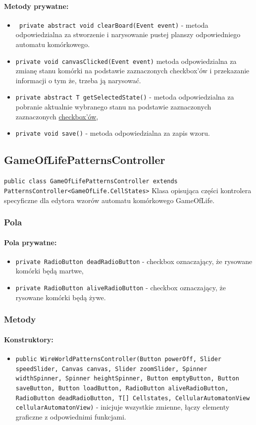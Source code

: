 \documentclass{report}
\begin{document}
\paragraph{Metody prywatne:}
\begin{itemize}
 	\item \texttt{ private abstract void clearBoard(Event event)} - metoda odpowiedzialna za stworzenie i narysowanie pustej planszy odpowiedniego automatu komórkowego.
 	\item \texttt{private void canvasClicked(Event event)} metoda odpowiedzialna za zmianę stanu komórki na podstawie zaznaczonych checkbox'ów i przekazanie informacji o tym że, trzeba ją narysować.
 	\item \texttt{private abstract T getSelectedState()} - metoda odpowiedzialna za pobranie aktualnie wybranego stanu na podstawie zaznaczonych  zaznaczonych \hyperref[sec:checkbox]{checkbox'ów},
 	\item \texttt{private void save()} - metoda odpowiedzialna za zapis wzoru.
\end{itemize}

\subsection{GameOfLifePatternsController}
\texttt{public class GameOfLifePatternsController extends PatternsController<GameOfLife.CellStates>}
Klasa opisująca części kontrolera specyficzne dla edytora wzorów automatu komórkowego GameOfLife.
\subsubsection{Pola}
\paragraph{Pola prywatne:}
\begin{itemize}	\label{sec:checkbox}
	\item \texttt{private RadioButton deadRadioButton} - checkbox oznaczający, że rysowane komórki będą martwe,
	\item \texttt{private RadioButton aliveRadioButton} - checkbox oznaczający, że rysowane komórki będą żywe.
\end{itemize}

\subsubsection{Metody}
\paragraph{Konstruktory:}
\begin{itemize}
\item \texttt{public WireWorldPatternsController(Button powerOff, Slider speedSlider, Canvas canvas, Slider zoomSlider, Spinner widthSpinner, Spinner heightSpinner, Button emptyButton, Button saveButton, Button loadButton, RadioButton aliveRadioButton, RadioButton deadRadioButton, T[] Cellstates, CellularAutomatonView cellularAutomatonView)} - inicjuje wszystkie zmienne, łączy elementy graficzne z odpowiednimi funkcjami.
\end{itemize}
\end{document}
